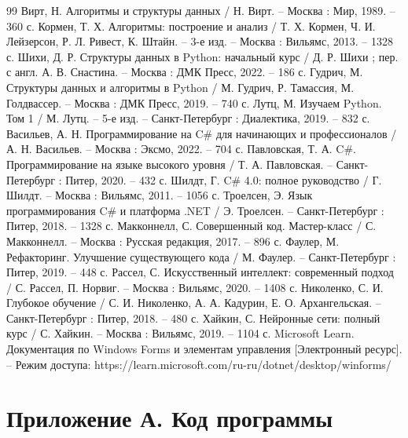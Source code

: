 \documentclass[12pt,a4paper]{article}
\begin{document}
\newpage
\centeredrefname
\clearpage
{}
{}
\begin{thebibliography}{99}
 Вирт, Н. Алгоритмы и структуры данных / Н. Вирт. -- Москва : Мир, 1989. -- 360 с.
 Кормен, Т. Х. Алгоритмы: построение и анализ / Т. Х. Кормен, Ч. И. Лейзерсон, Р. Л. Ривест, К. Штайн. -- 3-е изд. -- Москва : Вильямс, 2013. -- 1328 с.
 Шихи, Д. Р. Структуры данных в Python: начальный курс / Д. Р. Шихи ; пер. с англ. А. В. Снастина. -- Москва : ДМК Пресс, 2022. -- 186 с.
 Гудрич, М. Структуры данных и алгоритмы в Python / М. Гудрич, Р. Тамассия, М. Голдвассер. -- Москва : ДМК Пресс, 2019. -- 740 с.
 Лутц, М. Изучаем Python. Том 1 / М. Лутц. -- 5-е изд. -- Санкт-Петербург : Диалектика, 2019. -- 832 с.
 Васильев, А. Н. Программирование на C\# для начинающих и профессионалов / А. Н. Васильев. -- Москва : Эксмо, 2022. -- 704 с.
 Павловская, Т. А. C\#. Программирование на языке высокого уровня / Т. А. Павловская. -- Санкт-Петербург : Питер, 2020. -- 432 с.
 Шилдт, Г. C\# 4.0: полное руководство / Г. Шилдт. -- Москва : Вильямс, 2011. -- 1056 с.
 Троелсен, Э. Язык программирования C\# и платформа .NET / Э. Троелсен. -- Санкт-Петербург : Питер, 2018. -- 1328 с.
 Макконнелл, С. Совершенный код. Мастер-класс / С. Макконнелл. -- Москва : Русская редакция, 2017. -- 896 с.
 Фаулер, М. Рефакторинг. Улучшение существующего кода / М. Фаулер. -- Санкт-Петербург : Питер, 2019. -- 448 с.
 Рассел, С. Искусственный интеллект: современный подход / С. Рассел, П. Норвиг. -- Москва : Вильямс, 2020. -- 1408 с.
 Николенко, С. И. Глубокое обучение / С. И. Николенко, А. А. Кадурин, Е. О. Архангельская. -- Санкт-Петербург : Питер, 2018. -- 480 с.
 Хайкин, С. Нейронные сети: полный курс / С. Хайкин. -- Москва : Вильямс, 2019. -- 1104 с.
 Microsoft Learn. Документация по Windows Forms и элементам управления [Электронный ресурс]. -- Режим доступа: https://learn.microsoft.com/ru-ru/dotnet/desktop/winforms/
\end{thebibliography}

\newpage
{}
{}
\section*{Приложение А. Код программы}
\end{document}
